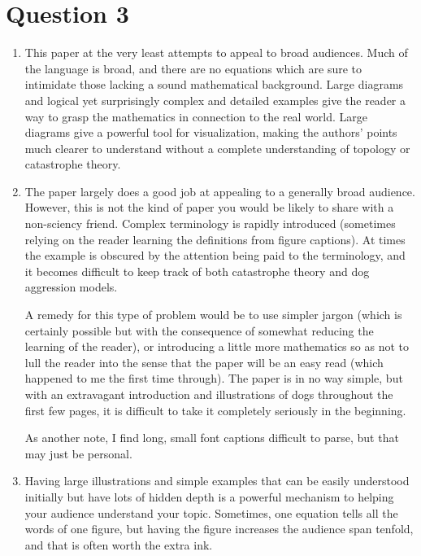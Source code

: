 \documentclass[12pt,a4paper]{article}
\begin{document}
\section{Question 3}

\begin{enumerate}[label = (\roman*)]
\item This paper at the very least attempts to appeal to broad audiences. Much of the language is broad, and there are no equations which are sure to intimidate those lacking a sound mathematical background. Large diagrams and logical yet surprisingly complex and detailed examples give the reader a way to grasp the mathematics in connection to the real world. Large diagrams give a powerful tool for visualization, making the authors' points much clearer to understand without a complete understanding of topology or catastrophe theory.

\item The paper largely does a good job at appealing to a generally broad audience. However, this is not the kind of paper you would be likely to share with a non-sciency friend. Complex terminology is rapidly introduced (sometimes relying on the reader learning the definitions from figure captions). At times the example is obscured by the attention being paid to the terminology, and it becomes difficult to keep track of both catastrophe theory and dog aggression models.

A remedy for this type of problem would be to use simpler jargon (which is certainly possible but with the consequence of somewhat reducing the learning of the reader), or introducing a little more mathematics so as not to lull the reader into the sense that the paper will be an easy read (which happened to me the first time through). The paper is in no way simple, but with an extravagant introduction and illustrations of dogs throughout the first few pages, it is difficult to take it completely seriously in the beginning.

As another note, I find long, small font captions difficult to parse, but that may just be personal.

\item Having large illustrations and simple examples that can be easily understood initially but have lots of hidden depth is a powerful mechanism to helping your audience understand your topic. Sometimes, one equation tells all the words of one figure, but having the figure increases the audience span tenfold, and that is often worth the extra ink.

\end{enumerate}
\end{document}
